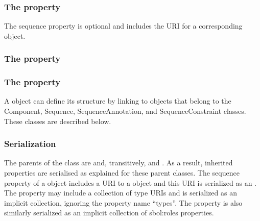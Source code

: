 \subsubsection*{The  property}
\label{sec:sequence}
The sequence property is optional and includes the URI for a corresponding  object.

\subsubsection*{The  property}
\label{sec:sequenceConstraint}


\subsubsection*{The  property}
\label{sec:sequenceAnnotation}


A  object can define its structure by linking to objects that belong to the Component, Sequence, SequenceAnnotation, and SequenceConstraint classes. These classes are described below.

\subsubsection*{Serialization}
The parents of the  class are  and, transitively,  and . As a result, inherited properties are serialised as explained for these parent classes. The sequence property of a  object includes a URI to a  object and this URI is serialized as an . The  property may include a collection of type URIs and is serialized as an implicit collection, ignoring the property name ``types''. The  property is also similarly serialized as an implicit collection of sbol:roles properties.

